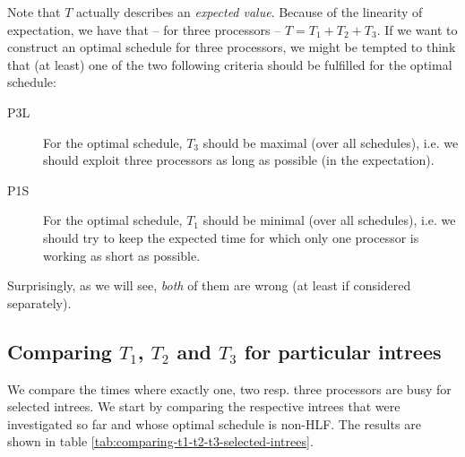 Note that $T$ actually describes an \emph{expected value}. Because of the linearity of expectation, we have that -- for three processors -- $T=T_1 + T_2 + T_3$. If we want to construct an optimal schedule for three processors, we might be tempted to think that (at least) one of the two following criteria should be fulfilled for the optimal schedule:

\begin{description}
\item[P3L] For the optimal schedule, $T_3$ should be maximal (over all schedules), i.e. we should exploit three processors as long as possible (in the expectation).
\item[P1S] For the optimal schedule, $T_1$ should be minimal (over all schedules), i.e. we should try to keep the expected time for which only one processor is working as short as possible.
\end{description}

Surprisingly, as we will see, \emph{both} of them are wrong (at least if considered separately).

\subsection{Comparing $T_1$, $T_2$ and $T_3$ for particular intrees}
\label{sec:comparing-t1-t2-t3-particular-intrees}

We compare the times where exactly one, two resp. three processors are busy for selected intrees. We start by comparing the respective intrees that were investigated so far and whose optimal schedule is non-HLF. The results are shown in table \ref{tab:comparing-t1-t2-t3-selected-intrees}.


